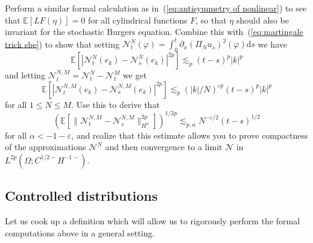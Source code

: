 \documentclass[a4paper,11pt]{article}
\newcommand{\mathd}{\mathrm{d}}
\begin{document}
\begin{exercise}
  Perform a similar formal calculation as in~(\ref{eq:antisymmetry of
  nonlinear}) to see that $\mathbb{E} [L F (\eta)] = 0$ for all cylindrical
  functions $F$, so that $\eta$ should also be invariant for the stochastic Burgers
  equation. Combine this with~(\ref{eq:martingale trick sbe}) to show that
  setting $\mathcal{N}_t^N (\varphi) = \int_0^t \partial_x (\Pi_N u_s)^2
  (\varphi) \mathd s$ we have
  \[ \mathbb{E} [| \mathcal{N}_t^N (e_k) -\mathcal{N}_s^N (e_k) |^{2 p}]
     \lesssim_p (t - s)^p | k |^p \]
  and letting $\mathcal{N}_t^{N, M} =\mathcal{N}_t^N -\mathcal{N}_t^M$ we get
  \[ \mathbb{E} [| \mathcal{N}_t^{N, M} (e_k) -\mathcal{N}_s^{N, M} (e_k)
     |^{2 p}] \lesssim_p (| k | / N)^{\varepsilon p} (t - s)^p | k |^p \]
  for all $1 \leqslant N \leqslant M$. Use this to derive that
  \[ (\mathbb{E} [\| \mathcal{N}_t^{N, M} -\mathcal{N}_s^{N, M} \|^{2
     p}_{H^{\alpha}}])^{1 / 2 p} \lesssim_{p, \alpha} N^{- \varepsilon / 2} (t
     - s)^{1 / 2} \]
  for all $\alpha < - 1 - \varepsilon$, and realize that this estimate allows
  you to prove compactness of the approximations $\mathcal{N}^N$ and then
  convergence to a limit $\mathcal{N}$ in $L^{2 p} (\Omega ; C^{1 / 2 -} H^{-
  1 -})$.
\end{exercise}

\subsection{Controlled distributions}

Let us cook up a definition which will allow us to rigorously perform the
formal computations above in a general setting.
\end{document}
